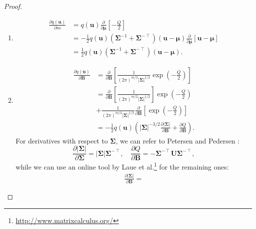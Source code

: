\documentclass{mpaper}
\newcommand{\dm}{\frac{\partial}{\partial\bm\mu}}
\newcommand{\dB}{\frac{\partial}{\partial\mathbf{B}}}
\begin{document}
\derivatives*
\begin{proof}
  \leavevmode
  \begin{enumerate}
  \item
    \[
      \begin{split}
        \frac{\partial q(\mathbf{u})}{\partial m} &=
        q(\mathbf{u})\dm\left[-\frac{Q}{2}\right]
        \\
        &= -\frac{1}{2}q(\mathbf{u})(\bm\Sigma^{-1} +
        \bm\Sigma^{-\intercal})(\mathbf{u} - \bm\mu)\dm[\mathbf{u} -
        \bm\mu] \\
        &= \frac{1}{2}q(\mathbf{u})(\bm\Sigma^{-1} +
        \bm\Sigma^{-\intercal})(\mathbf{u} - \bm\mu).
      \end{split}
    \]
  \item
    \begin{align}
      \frac{\partial q(\mathbf{u})}{\partial \mathbf{B}} &= \dB\left[\frac{1}{(2\pi)^{m/2}|\bm\Sigma|^{1/2}}\exp \left( -\frac{Q}{2} \right)\right] \nonumber \\
                                                         &= \dB\left[\frac{1}{(2\pi)^{m/2}|\bm\Sigma|^{1/2}}\right]\exp \left( -\frac{Q}{2} \right) \nonumber \\
                                                         &+ \frac{1}{(2\pi)^{m/2}|\bm\Sigma|^{1/2}}\dB\left[\exp\left( -\frac{Q}{2} \right)\right] \nonumber \\
                                                         &= -\frac{1}{2} q(\mathbf{u}) \left( |\bm\Sigma|^{-3/2} \frac{\partial |\bm\Sigma|}{\partial \mathbf{B}} + \frac{\partial Q}{\partial \mathbf{B}} \right). \label{eq:2_before}
    \end{align}
    For derivatives with respect to $\bm\Sigma$, we can refer to Petersen and
    Pedersen \cite{petersen2008matrix}:
    \begin{equation} \label{eq:partial_derivatives1}
      \frac{\partial |\bm\Sigma|}{\partial \bm\Sigma} = |\bm\Sigma|\bm\Sigma^{-\intercal}, \quad \frac{\partial Q}{\partial \mathbf{B}} = -\bm\Sigma^{-\intercal}\mathbf{U}\bm\Sigma^{-\intercal},
    \end{equation}
    while we can use an online tool by Laue et
    al.\footnote{\url{http://www.matrixcalculus.org/}}
    \cite{DBLP:conf/nips/LaueMG18} for the remaining ones:
    \begin{equation} \label{eq:partial_derivatives2}
      \begin{gathered}
        \frac{\partial |\bm\Sigma|}{\partial \mathbf{B}} =

\end{gathered}
\end{equation}
\end{enumerate}
\end{proof}
\end{document}
